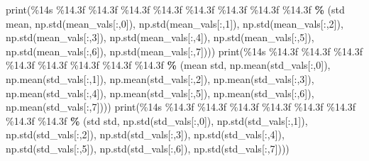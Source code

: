 \documentclass[
]{book}
\newenvironment{Shaded}{\begin{snugshade}}{\end{snugshade}}
\newcommand{\BuiltInTok}[1]{#1}
\newcommand{\DecValTok}[1]{\textcolor[rgb]{0.00,0.00,0.81}{#1}}
\newcommand{\NormalTok}[1]{#1}
\newcommand{\OperatorTok}[1]{\textcolor[rgb]{0.81,0.36,0.00}{\textbf{#1}}}
\newcommand{\SpecialCharTok}[1]{\textcolor[rgb]{0.00,0.00,0.00}{#1}}
\newcommand{\StringTok}[1]{\textcolor[rgb]{0.31,0.60,0.02}{#1}}
\begin{document}
\begin{Shaded}
\begin{Highlighting}[]
  \BuiltInTok{print}\NormalTok{(}\StringTok{\textquotesingle{}}\SpecialCharTok{\%14s}\StringTok{ }\SpecialCharTok{\%14.3f}\StringTok{ }\SpecialCharTok{\%14.3f}\StringTok{ }\SpecialCharTok{\%14.3f}\StringTok{ }\SpecialCharTok{\%14.3f}\StringTok{ }\SpecialCharTok{\%14.3f}\StringTok{ }\SpecialCharTok{\%14.3f}\StringTok{ }\SpecialCharTok{\%14.3f}\StringTok{ }\SpecialCharTok{\%14.3f}\StringTok{\textquotesingle{}} \OperatorTok{\%}\NormalTok{ (}\StringTok{\textquotesingle{}std mean\textquotesingle{}}\NormalTok{, np.std(mean\_vals[:,}\DecValTok{0}\NormalTok{]), np.std(mean\_vals[:,}\DecValTok{1}\NormalTok{]), np.std(mean\_vals[:,}\DecValTok{2}\NormalTok{]), np.std(mean\_vals[:,}\DecValTok{3}\NormalTok{]), np.std(mean\_vals[:,}\DecValTok{4}\NormalTok{]), np.std(mean\_vals[:,}\DecValTok{5}\NormalTok{]), np.std(mean\_vals[:,}\DecValTok{6}\NormalTok{]), np.std(mean\_vals[:,}\DecValTok{7}\NormalTok{])))}
  \BuiltInTok{print}\NormalTok{(}\StringTok{\textquotesingle{}}\SpecialCharTok{\%14s}\StringTok{ }\SpecialCharTok{\%14.3f}\StringTok{ }\SpecialCharTok{\%14.3f}\StringTok{ }\SpecialCharTok{\%14.3f}\StringTok{ }\SpecialCharTok{\%14.3f}\StringTok{ }\SpecialCharTok{\%14.3f}\StringTok{ }\SpecialCharTok{\%14.3f}\StringTok{ }\SpecialCharTok{\%14.3f}\StringTok{ }\SpecialCharTok{\%14.3f}\StringTok{\textquotesingle{}} \OperatorTok{\%}\NormalTok{ (}\StringTok{\textquotesingle{}mean std\textquotesingle{}}\NormalTok{, np.mean(std\_vals[:,}\DecValTok{0}\NormalTok{]), np.mean(std\_vals[:,}\DecValTok{1}\NormalTok{]), np.mean(std\_vals[:,}\DecValTok{2}\NormalTok{]), np.mean(std\_vals[:,}\DecValTok{3}\NormalTok{]), np.mean(std\_vals[:,}\DecValTok{4}\NormalTok{]), np.mean(std\_vals[:,}\DecValTok{5}\NormalTok{]), np.mean(std\_vals[:,}\DecValTok{6}\NormalTok{]), np.mean(std\_vals[:,}\DecValTok{7}\NormalTok{])))}
  \BuiltInTok{print}\NormalTok{(}\StringTok{\textquotesingle{}}\SpecialCharTok{\%14s}\StringTok{ }\SpecialCharTok{\%14.3f}\StringTok{ }\SpecialCharTok{\%14.3f}\StringTok{ }\SpecialCharTok{\%14.3f}\StringTok{ }\SpecialCharTok{\%14.3f}\StringTok{ }\SpecialCharTok{\%14.3f}\StringTok{ }\SpecialCharTok{\%14.3f}\StringTok{ }\SpecialCharTok{\%14.3f}\StringTok{ }\SpecialCharTok{\%14.3f}\StringTok{\textquotesingle{}} \OperatorTok{\%}\NormalTok{ (}\StringTok{\textquotesingle{}std std\textquotesingle{}}\NormalTok{, np.std(std\_vals[:,}\DecValTok{0}\NormalTok{]), np.std(std\_vals[:,}\DecValTok{1}\NormalTok{]), np.std(std\_vals[:,}\DecValTok{2}\NormalTok{]), np.std(std\_vals[:,}\DecValTok{3}\NormalTok{]), np.std(std\_vals[:,}\DecValTok{4}\NormalTok{]), np.std(std\_vals[:,}\DecValTok{5}\NormalTok{]), np.std(std\_vals[:,}\DecValTok{6}\NormalTok{]), np.std(std\_vals[:,}\DecValTok{7}\NormalTok{])))}

\end{Highlighting}
\end{Shaded}
\end{document}
